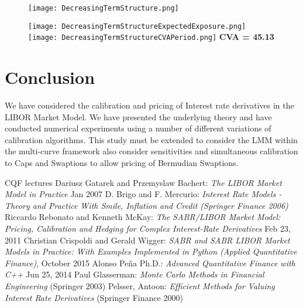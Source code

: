 \documentclass[11pt]{article}
\numberwithin{equation}{subsection}
\begin{document}
\begin{figure}[H]
	\texttt{[image: DecreasingTermStructure.png]}
\end{figure}


\begin{figure}[H]
	\texttt{[image: DecreasingTermStructureExpectedExposure.png]}
	\texttt{[image: DecreasingTermStructureCVAPeriod.png]}
	\textbf{CVA = 45.13}
\end{figure}


\newpage
\section{Conclusion}
We have considered the calibration and pricing of Interest rate derivatives in the LIBOR Market
Model. We have presented the underlying theory and have conducted
numerical experiments using a number of different variations of calibration algorithms. This study must be extended to consider the LMM within the multi-curve framework also consider sensitivities and simultaneous calibration to Caps and Swaptions to allow pricing of Bermudian Swaptions.

\newpage
{\small
\begin{thebibliography}{99}
	  CQF lectures 
	  Dariusz Gatarek and Przemyslaw Bachert: 
	\emph{The LIBOR Market Model in Practice} Jan 2007
	 D. Brigo and F. Mercurio: 
	\emph{Interest Rate Models - Theory and Practice With Smile, Inflation and Credit (Springer Finance 2006)}
	 Riccardo Rebonato and Kenneth McKay: 
	\emph{The SABR/LIBOR Market Model: Pricing, Calibration and Hedging for Complex Interest-Rate Derivatives} Feb 23, 2011	 Christian  Crispoldi and Gerald Wigger:
	\emph{SABR and SABR LIBOR Market Models in Practice: With Examples Implemented in Python (Applied Quantitative Finance)}, October 2015
	 Alonso Pe\~{n}a Ph.D.:
	\emph{Advanced Quantitative Finance with C++} Jun 25, 2014	
	 Paul Glasserman:
	\emph{Monte Carlo Methods in Financial Engineering}	(Springer 2003)
	 Pelsser, Antoon:
	\emph{Efficient Methods for Valuing Interest Rate Derivatives} (Springer Finance 2000) 
\end{thebibliography}
}
\end{document}
